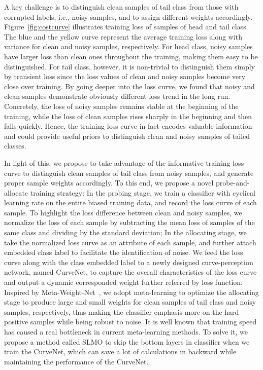 \documentclass[letterpaper]{article} %
\begin{document}

A key challenge is to distinguish clean samples of tail class from those with corrupted labels, i.e., noisy samples, and to assign different weights accordingly. Figure~\ref{fig:costcurve} illustrates training loss of samples of head and tail class. The blue and the yellow curve represent the average training loss along with variance for clean and noisy samples, respectively. For head class, noisy samples have larger loss than clean ones throughout the training, making them easy to be distinguished. For tail class, however, it is non-trivial to distinguish them simply by transient loss since the loss values of clean and noisy samples become very close over training. By going deeper into the loss curve, we found that noisy and clean samples demonstrate obviously different loss trend in the long run. Concretely, the loss of noisy samples remains stable at the beginning of the training, while the loss of clean samples rises sharply in the beginning and then falls quickly. Hence, the training loss curve in fact encodes valuable information and could provide useful priors to distinguish clean and noisy samples of tailed classes.

In light of this, we propose to take advantage of the informative training loss curve to distinguish clean samples of tail class from noisy samples, and generate proper sample weights accordingly. To this end, we propose a novel probe-and-allocate training strategy: In the probing stage, we train a classifier with cyclical learning rate on the entire biased training data, and record the loss curve of each sample. To highlight the loss difference between clean and noisy samples, we normalize the loss of each sample by subtracting the mean loss of samples of the same class and dividing by the standard deviation; In the allocating stage, we take the normalized loss curve as an attribute of each sample, and further attach embedded class label to facilitate the identification of noise. We feed the loss curve along with the class embedded label to a newly designed curve-perception network, named CurveNet, to capture the overall characteristics of the loss curve and output a dynamic corresponded weight further referred by loss function. Inspired by Meta-Weight-Net~\cite{shu2019meta}, we adopt meta-learning to optimize the allocating stage to produce large and small weights for clean samples of tail class and noisy samples, respectively, thus making the classifier emphasis more on the hard positive samples while being robust to noise.
It is well known that training speed has caused a real bottleneck in current meta-learning methods.
To solve it, we propose a method called SLMO to skip the bottom layers in classifier when we train the CurveNet, which can save a lot of calculations in backward while maintaining the performance of the CurveNet.
\end{document}
